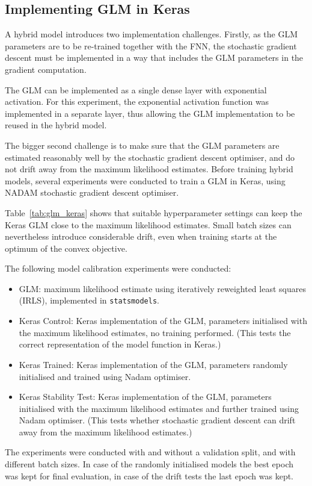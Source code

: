 \documentclass[a4paper]{article}
\begin{document}
\subsection{Implementing GLM in Keras}
A hybrid model introduces two implementation challenges.
Firstly, as the GLM parameters are to be re-trained together with the FNN,
the stochastic gradient descent must be implemented in a way that includes the GLM parameters in the gradient computation.

The GLM can be implemented as a single dense layer with exponential activation. For this experiment, the exponential activation
function was implemented in a separate layer, thus allowing the GLM implementation to be reused in the hybrid model.

The bigger second challenge is to make sure that the GLM parameters are estimated reasonably well by the stochastic gradient descent optimiser, and do not drift away from the maximum likelihood estimates.
Before training hybrid models, several experiments were conducted to train a GLM in Keras, using NADAM stochastic gradient descent optimiser.

Table~\ref{tab:glm_keras} shows that suitable hyperparameter settings
can keep the Keras GLM close to the maximum likelihood estimates.
Small batch sizes can nevertheless introduce considerable drift, even
when training starts at the optimum of the convex objective.

The following model calibration experiments were conducted:
\begin{itemize}
\item {GLM: maximum likelihood estimate using iteratively reweighted least squares (IRLS), implemented in \texttt{statsmodels}.}
\item {Keras Control: Keras implementation of the GLM, parameters initialised with the maximum likelihood estimates, no training performed. (This tests the correct representation of the model function in Keras.)}
\item {Keras Trained: Keras implementation of the GLM, parameters randomly initialised and trained using Nadam optimiser.}
\item {Keras Stability Test: Keras implementation of the GLM, parameters initialised with the maximum likelihood estimates and further trained using Nadam optimiser. (This tests whether stochastic gradient descent can drift away from the maximum likelihood estimates.)}
\end{itemize}

The experiments were conducted with and without a validation split, and with different batch sizes. In case of the randomly initialised models the best epoch was kept for final evaluation, in case of the drift tests the last epoch was kept.
\end{document}

